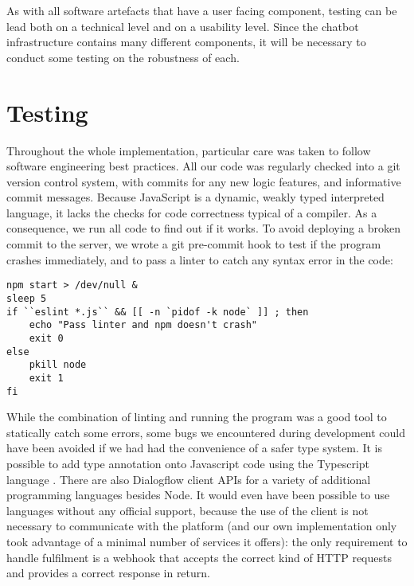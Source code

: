As with all software artefacts that have a user facing component, testing can be lead both on a technical level and on a usability level. Since the chatbot infrastructure contains many different components, it will be necessary to conduct some testing on the robustness of each.
\section{Testing}
Throughout the whole implementation, particular care was taken to follow software engineering best practices. All our code was regularly checked into a git version control system, with commits for any new logic features, and informative commit messages. Because JavaScript is a dynamic, weakly typed interpreted language, it lacks the checks for code correctness typical of a compiler. As a consequence, we run all code to find out if it works. To avoid deploying a broken commit to the server, we wrote a git pre-commit hook to test if the program crashes immediately, and to pass a linter to catch any syntax error in the code:
\begin{lstlisting}
npm start > /dev/null &
sleep 5
if ``eslint *.js`` && [[ -n `pidof -k node` ]] ; then
    echo "Pass linter and npm doesn't crash"
    exit 0
else
    pkill node
    exit 1
fi
\end{lstlisting}
While the combination of linting and running the program was a good tool to statically catch some errors, some bugs we encountered during development could have been avoided if we had had the convenience of a safer type system. It is possible to add type annotation onto Javascript code using the Typescript language \cite{typescript}. There are also Dialogflow client APIs for a variety of additional programming languages besides Node. It would even have been possible to use languages without any official support, because the use of the client is not necessary to communicate with the platform (and our own implementation only took advantage of a minimal number of services it offers): the only requirement to handle fulfilment is a webhook that accepts the correct kind of HTTP requests and provides a correct response in return. 

